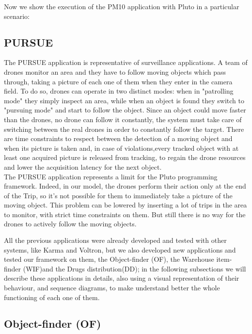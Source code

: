 Now we show the execution of the PM10 application with Pluto in a particular scenario:


\subsection{PURSUE}


The PURSUE application\cite{pursue} is representative of surveillance applications. A team of drones monitor an area and they have to follow moving objects which pass through, taking a picture of each one of them when they enter in the camera field.
To do so, drones can operate in two distinct modes: when in "patrolling mode" they simply inspect an area, while when an object is found they switch to "pursuing mode" and start to follow the object.
Since an object could move faster than the drones, no drone can follow it constantly, the system must take care of switching between the real drones in order to constantly follow the target.
There are time constraints to respect between the detection of a moving object and when its picture is taken and, in case of violations,every tracked object with at least one acquired picture is released from tracking, to regain the drone resources and lower the acquisition latency for the next object.
\\

The PURSUE application represents a limit for the Pluto programming framework.
Indeed, in our model, the drones perform their action only at the end of the Trip, so it's not possible for them to immediately take a picture of the moving object.
This problem can be lowered by inserting a lot of trips in the area to monitor, with strict time constraints on them.
But still there is no way for the drones to actively follow the moving objects.


\newpage

All the previous applications were already developed and tested with other systems, like Karma\cite{karma} and Voltron\cite{voltron}, but we also developed new applications and tested our framework on them, the Object-finder (OF), the Warehouse item-finder (WIF)and the Drugs distribution(DD); in the following subsections we will describe these applications in details, also using a visual representation of their behaviour, and sequence diagrams, to make understand better the whole functioning of each one of them.

\subsection{Object-finder (OF)}


